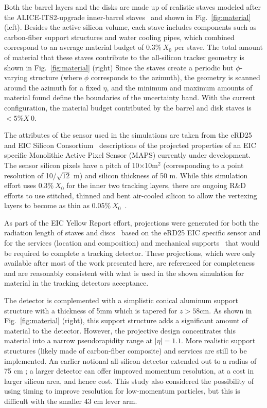 Both the barrel layers and the disks are made up of realistic staves modeled after the ALICE-ITS2-upgrade inner-barrel staves~\cite{Abelevetal:2014dna,Keil:2015vta,Reidt:2016ysg}
and shown in Fig.~\ref{fig:material} (left).
Besides the active silicon volume, each stave includes components such as carbon-fiber support structures and water cooling pipes, which combined correspond to an average material budget of 0.3$\%~X_0$ per stave.
The total amount of material that these staves contribute to the all-silicon tracker geometry is shown in Fig.~\ref{fig:material} (right)
Since the staves create a periodic but $\phi$-varying structure (where $\phi$ corresponds to the azimuth), the geometry is scanned around the azimuth for a fixed $\eta$, and the minimum and maximum amounts of material found define the boundaries of the uncertainty band.
With the current configuration, the material budget contributed by the barrel and disk staves is $<5\%X~0$.

The attributes of the sensor used in the simulations are taken from the eRD25 and EIC Silicon Consortium~\cite{eRD25} descriptions of the projected properties of an EIC specific Monolithic Active Pixel Sensor (MAPS) currently under development.
The sensor silicon pixels have a pitch of 10$\times$10\textmu m$^2$ (corresponding to a point resolution of 10/$\sqrt{12}$ \textmu m) and silicon thickness of 50 \textmu m. While this simulation effort uses 0.3$\%~X_0$ for the inner two tracking layers, there are ongoing R\&D efforts to use stitched, thinned and bent air-cooled silicon to allow the vertexing layers to become as thin as 0.05$\%~X_0$~\cite{its3det}. 

As part of the EIC Yellow Report effort, projections were generated for both the radiation length of staves and discs~\cite{leo} based on the eRD25 EIC specific sensor and for the services (location and composition) and mechanical supports~\cite{leo2} that would be required to complete a tracking detector. These projections, which were only available after most of the work presented here, are referenced for completeness and are reasonably consistent with what is used in the shown simulation for material in the tracking detectors acceptance.

The detector is complemented with a simplistic conical aluminum support structure with a thickness of 5mm which is tapered for $z>58$cm. As shown in Fig.~\ref{fig:material} (right), this support structure adds a significant amount of material 
to the detector. However, the projective design concentrates this material into a narrow pseudorapidity range at $|\eta|=1.1$.
More realistic support structures (likely made of carbon-fiber composite) and services are still to be implemented.  
An earlier notional all-silicon detector extended out to a radius of 75 cm \cite{Klein:2020sts}; a larger detector can offer improved momentum resolution, at a cost in larger silicon area, and hence cost.  This study also considered the possibility of using timing to improve resolution for low-momentum particles, but this is difficult with the smaller 43 cm lever arm.

